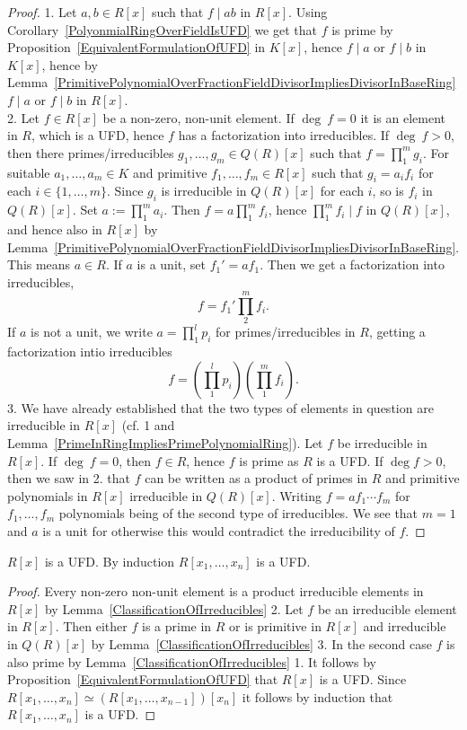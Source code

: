 \begin{proof}
    1. Let $a,b\in R[x]$ such that $f\mid ab$ in $R[x]$. Using Corollary~\ref{PolyonmialRingOverFieldIsUFD} we get that $f$ is prime by Proposition~\ref{EquivalentFormulationOfUFD} in $K[x]$, hence $f \mid a$ or $f \mid b$ in $K[x]$, hence by Lemma~\ref{PrimitivePolynomialOverFractionFieldDivisorImpliesDivisorInBaseRing} $f\mid a$ or $f\mid b$ in $R[x]$.\\
    2. Let $f\in R[x]$ be a non-zero, non-unit element. If $\deg \ f =0$ it is an element in $R$, which is a UFD, hence $f$ has a factorization into irreducibles. If $\deg \ f>0$, then there primes/irreducibles $g_1,\dots,g_m\in Q(R)[x]$ such that $f = \prod_1^m g_i$. For suitable $a_1,\dots,a_m\in K$ and primitive $f_1,\dots,f_m\in R[x]$ such that $g_i = a_if_i$ for each $i\in\{1,\dots,m\}$. Since $g_i$ is irreducible in $Q(R)[x]$ for each $i$, so is $f_i$ in $Q(R)[x]$. Set $a := \prod_1^m a_i$. Then $f = a\prod_1^m f_i$, hence $\prod_1^m f_i \mid f$ in $Q(R)[x]$, and hence also in $R[x]$ by Lemma~\ref{PrimitivePolynomialOverFractionFieldDivisorImpliesDivisorInBaseRing}. This means $a \in R$. If $a$ is a unit, set $f_1' = af_1$. Then we get a factorization into irreducibles,
    $$f = f_1'\prod_2^mf_i.$$
    If $a$ is not a unit, we write $a = \prod_1^l p_i$ for primes/irreducibles in $R$, getting a factorization intio irreducibles
    $$f = \left(\prod_1^l p_i \right)\left(\prod_1^m f_i\right).$$
    3. We have already established that the two types of elements in question are irreducible in $R[x]$ (cf. 1 and Lemma~\ref{PrimeInRingImpliesPrimePolynomialRing}). Let $f$ be irreducible in $R[x]$. If $\deg\ f = 0$, then $f\in R$, hence $f$ is prime as $R$ is a UFD. If $\deg f>0$, then we saw in 2. that  $f$ can be written as a product of primes in $R$ and primitive polynomials in $R[x]$ irreducible in $Q(R)[x]$. Writing $f = a f_1\cdots f_m $ for $f_1,\dots,f_m$ polynomials being of the second type of irreducibles. We see that $m=1$ and $a$ is a unit for otherwise this would contradict the irreducibility of $f$.   
\end{proof}
\begin{theorem}
    $R[x]$ is a UFD. By induction $R[x_1,\dots,x_n]$ is a UFD.
\end{theorem}
\begin{proof}
    Every non-zero non-unit element is a product irreducible elements in $R[x]$ by Lemma~\ref{ClassificationOfIrreducibles} 2. Let $f$ be an irreducible element in $R[x]$. Then either $f$ is a prime in $R$ or is primitive in $R[x]$ and irreducible in $Q(R)[x]$ by Lemma~\ref{ClassificationOfIrreducibles} 3. In the second case $f$ is also prime by Lemma~\ref{ClassificationOfIrreducibles} 1. It follows by Proposition~\ref{EquivalentFormulationOfUFD} that $R[x]$ is a UFD. Since $R[x_1,\dots,x_{n}]\simeq (R[x_1,\dots,x_{n-1}])[x_n]$ it follows by induction that $R[x_1,\dots,x_n]$ is a UFD. 
\end{proof}
